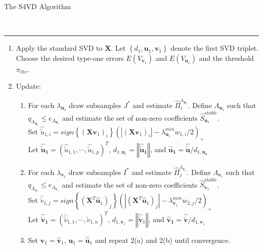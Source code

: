 \begin{bf}The S4VD Algorithm\end{bf}\\
\hspace{-0.1cm} 
\rule{14.75 cm}{1pt}
\begin{enumerate}
 \item Apply the standard SVD to $\mathbf{X}$. Let $\left\{ d_{1}, \mathbf{u}_{1}, \mathbf{v}_{1} \right\}$ denote the first SVD triplet. Choose the desired type-one errors $E(V_{\mathbf{v}_{1}})$ and $E(V_{\mathbf{u}_{1}})$ and the threshold $\pi_{thr}$.
 \item Update:
  \begin{enumerate}
   \item For each $\lambda_{\mathbf{u}_{1}}$ draw subsamples $J^{*}$ and estimate $\hat{\Pi}_{i}^{\lambda_{\mathbf{u}_{1}}}$.
	 Define $\Lambda_{\mathbf{u}_{1}}$ such that $q_{\Lambda_{\mathbf{u}_{1}}} \leq e_{\Lambda_{\mathbf{u}_{1}}}$ and estimate the set of non-zero coefficients
	 $\hat{S}_{\mathbf{u}_{1}}^{stable}$.\\
	 Set $\hat{\tilde{u}}_{1,i}=\textit{sign} \left\{(\mathbf{X}\mathbf{v}_{1})_{i} \right\} (|(\mathbf{X}\mathbf{v}_{1})_{i}|- \lambda^{min}_{\mathbf{u}_{1}}w_{1,i}/2)_{+} $ \\
	 Let $\mathbf{\hat{\tilde{u}}_{1}}=(\hat{\tilde{u}}_{1,1},\cdots,\hat{\tilde{u}}_{1,p})^{T}$,
	 $d_{1,\mathbf{u}_{1}}=\left\Vert \mathbf{\hat{\tilde{u}}_{1}} \right\Vert$, 
	 and $\mathbf{\hat{u}_{1}} =\mathbf{\hat{\tilde{u}}}/d_{1,\mathbf{u_{1}}}$
    \item 
	 For each $\lambda_{\mathbf{v}_{1}}$ draw subsamples $I^{*}$ and estimate $\hat{\Pi}_{j}^{\lambda_{\mathbf{v}_{1}}}$.
	 Define $\Lambda_{\mathbf{v}_{1}}$ such that $q_{\Lambda_{\mathbf{v}_{1}}} \leq e_{\Lambda_{\mathbf{v}_{1}}}$ and estimate
	 the set of non-zero coefficients $\hat{S}_{\mathbf{v}_{1}}^{stable}$. \\
	 Set $\hat{\tilde{v}}_{1,j}= \textit{sign}\left\{(\mathbf{X}^{T}\mathbf{\hat{u}}_{1})_{j}\right\}(|(\mathbf{X}^{T}\mathbf{\hat{u}}_{1})_{j}|-\lambda^{min}_{\mathbf{v}_{1}}w_{2,j}/2)_{+}$ \\
	 Let $\mathbf{\hat{\tilde{v}}_{1}}=(\hat{\tilde{v}}_{1,1},\cdots,\hat{\tilde{v}}_{1,n})^{T}$,
	 $d_{1,\mathbf{v}_{1}}=\left\Vert \mathbf{\hat{\tilde{v}}}_{1} \right\Vert$, 
	 and $\mathbf{\hat{v}_{1}} =\mathbf{\hat{\tilde{v}}}/d_{1,\mathbf{v}_{1}}$
   \item Set $\mathbf{v}_{1}=\mathbf{\hat{v}}_{1}$, $\mathbf{u}_{1}=\mathbf{\hat{u}}_{1}$ and repeat 2(a) and 2(b) until convergence.

\end{enumerate}
\end{enumerate}
